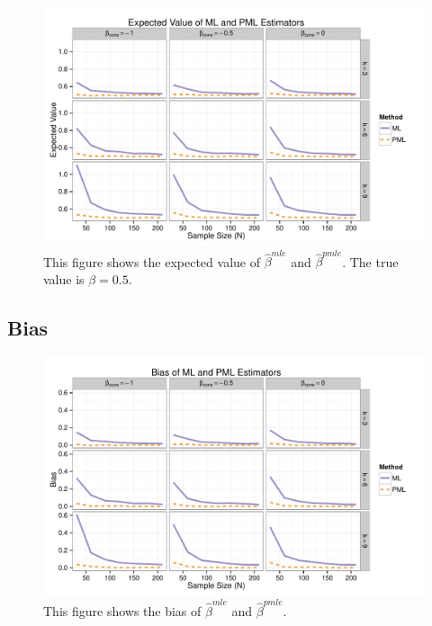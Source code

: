 \documentclass[12pt]{article}
\begin{document}
\begin{appendix}
\begin{figure}[H]
\begin{center}
\includegraphics[width = \textwidth]{figs/sims-ev.pdf}
\caption{This figure shows the expected value of $\hat{\beta}^{mle}$ and $\hat{\beta}^{pmle}$. The true value is $\beta = 0.5$.}\label{fig:ev}
\end{center}
\end{figure}

\subsection{Bias}

\begin{figure}[H]
\begin{center}
\includegraphics[width = \textwidth]{figs/sims-bias.pdf}
\caption{This figure shows the bias of $\hat{\beta}^{mle}$ and $\hat{\beta}^{pmle}$.}\label{fig:bias}
\end{center}
\end{figure}


\end{appendix}
\end{document}
